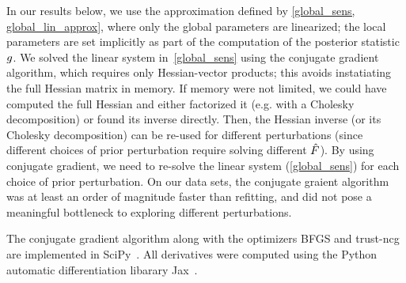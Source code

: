 In our results below, we use
the approximation defined by \eqref{global_sens, global_lin_approx},
where only the global parameters are linearized;
the local parameters are set implicitly as part of the
computation of the posterior statistic $g$.
We solved the linear system in~\eqref{global_sens} using
the conjugate gradient algorithm, which requires only Hessian-vector products;
this avoids instatiating the full Hessian matrix in memory.
If memory were not limited,
we could have computed the full Hessian and
either factorized it (e.g. with a Cholesky decomposition) or found its inverse directly.
Then, the Hessian inverse (or its Cholesky decomposition) can
be re-used for different perturbations
(since different choices of prior perturbation
require solving different $\hat F$).
By using conjugate gradient, we need to re-solve the linear system (\eqref{global_sens})
for each choice of prior perturbation.
On our data sets, the conjugate graient algorithm was at least
an order of magnitude faster than refitting, and did not pose a meaningful bottleneck
to exploring different perturbations.

The conjugate gradient algorithm along with the optimizers BFGS and trust-ncg
are implemented in SciPy~\citep{scipy}.
All derivatives were computed using the Python
automatic differentiation libarary Jax~\citep{jax2018github}.



